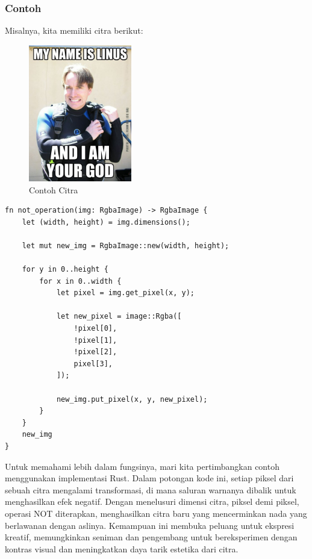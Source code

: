 \documentclass[a4paper,12pt,openany]{book}
\begin{document}
\subsubsection{Contoh}
Misalnya, kita memiliki citra berikut:
\begin{figure}[H]
    \centering
    \includegraphics[width=0.4\textwidth]{./image/boolean/linus-meme.jpg}
    \caption{Contoh Citra}
\end{figure}

\begin{lstlisting}
fn not_operation(img: RgbaImage) -> RgbaImage {
    let (width, height) = img.dimensions();

    let mut new_img = RgbaImage::new(width, height);

    for y in 0..height {
        for x in 0..width {
            let pixel = img.get_pixel(x, y);

            let new_pixel = image::Rgba([
                !pixel[0],
                !pixel[1],
                !pixel[2],
                pixel[3],
            ]);

            new_img.put_pixel(x, y, new_pixel);
        }
    }
    new_img
}
\end{lstlisting}

Untuk memahami lebih dalam fungsinya, mari kita pertimbangkan contoh menggunakan implementasi Rust. Dalam potongan kode ini, setiap piksel dari sebuah citra mengalami transformasi, di mana saluran warnanya dibalik untuk menghasilkan efek negatif. Dengan menelusuri dimensi citra, piksel demi piksel, operasi NOT diterapkan, menghasilkan citra baru yang mencerminkan nada yang berlawanan dengan aslinya. Kemampuan ini membuka peluang untuk ekspresi kreatif, memungkinkan seniman dan pengembang untuk bereksperimen dengan kontras visual dan meningkatkan daya tarik estetika dari citra.
\end{document}
